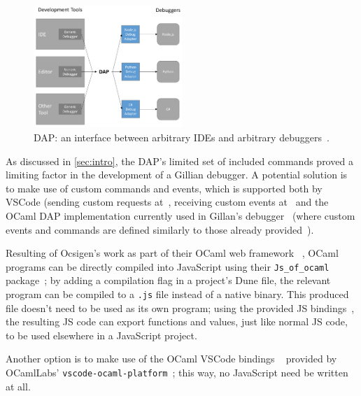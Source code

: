 \begin{figure}[!t]
  \centering
  \includegraphics[width=0.5\textwidth]{img/dap-diagram.png}
  \caption{
    DAP: an interface between arbitrary IDEs and
    arbitrary debuggers~\cite{dap}.
  }
  \label{fig:dap-diagram}
\end{figure}

As discussed in \autoref{sec:intro}, the DAP's limited set of
included commands proved a limiting factor in the development of a Gillian
debugger. A potential solution is to make use of custom commands and events,
which is supported both by VSCode (sending custom requests
at~\cite{vscode-dap-custom-request}, receiving custom events
at~\cite{vscode-dap-custom-event} and the OCaml DAP
implementation currently used in Gillan's debugger~\cite{ocaml-dap} (where
custom events and commands are defined similarly to those already
provided~\cite{ocaml-dap-custom}).



Resulting of Ocsigen's work as part of their OCaml web framework
~\cite{ocsigen-framework}, OCaml programs can be directly compiled into
JavaScript using their \texttt{Js\_of\_ocaml} package~\cite{js-of-ocaml}; by
adding a compilation flag in a project's Dune file, the relevant program can be
compiled to a \texttt{.js} file instead of a native binary. This produced file
doesn't need to be used as its own program; using the provided JS
bindings~\cite{js-of-ocaml-bindings}, the resulting JS code can export
functions and values, just like normal JS code, to be used elsewhere in a
JavaScript project.

Another option is to make use of the OCaml VSCode bindings
~\cite{vscode-ocaml-bindings} provided by OCamlLabs'
\texttt{vscode-ocaml-platform}~\cite{vscode-ocaml-platform, ocamllabs}; this
way, no JavaScript need be written at all.


